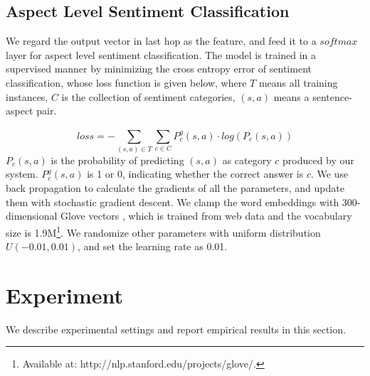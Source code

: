\documentclass[11pt,letterpaper]{article}
\begin{document}
\subsection{Aspect Level Sentiment Classification}
We regard the output vector in last hop as the feature, and feed it to a $softmax$ layer for aspect level sentiment classification. 
The model is trained in a supervised manner by minimizing the cross entropy error of sentiment classification, whose loss function is given below, where $T$ means all training instances, $C$ is the collection of sentiment categories, $(s, a)$ means a sentence-aspect pair.

\begin{equation}
	loss = -\sum_{(s,a) \in T}^{}\sum_{c \in C} P_{c}^{g}(s, a) \cdot log(P_{c}(s, a))
\end{equation}
$P_c(s, a)$ is the probability of predicting $(s, a)$ as category $c$ produced by our system. 
$P^g_c(s, a)$ is 1 or 0, indicating whether the correct answer is $c$.
We use back propagation to calculate the gradients of all the parameters, 
and update them with stochastic gradient descent. 
We clamp the word embeddings with 300-dimensional Glove vectors \cite{Pennington2014}, which is trained from web data and the vocabulary size is 1.9M\footnote{Available at: {http://nlp.stanford.edu/projects/glove/}.}.
We randomize other parameters with uniform distribution $U(-0.01, 0.01)$, and set the learning rate as 0.01.




\section{Experiment}
We describe experimental settings and report empirical results in this section.
\end{document}
